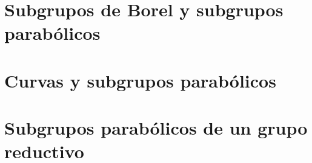 \section{Subgrupos de Borel y subgrupos parab\'{o}licos}\label{sec:parabolicos}


\section{Curvas y subgrupos parab\'{o}licos}\label{sec:cocaracteres}


\section{Subgrupos parab\'{o}licos de un grupo reductivo}\label{sec:reductivos}


\printbibliography[heading=bibintoc,title=\refname]
